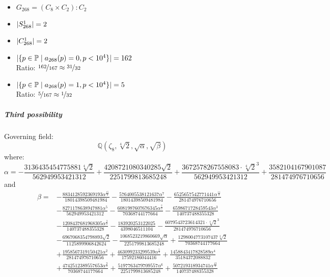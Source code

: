\begin{multicols}{2}
	\begin{itemize}
		\item $G_{268} = (C_8 \times C_2) : C_2$
		\item $| S_{268}^1 | = 2$
		\item $| C_{268}^1 | = 2$
	\end{itemize}
	\begin{itemize}
		\item $| \{ p \in \mathbb{P} \mid a_{268}(p)=0, p<10^4 \} | = 162$\\
		Ratio: $\nicefrac{ 162 }{ 167 } \approx \nicefrac{ 31 }{ 32 }$
		\item $| \{ p \in \mathbb{P} \mid a_{268}(p)=1, p<10^4 \} | = 5$\\
		Ratio: $\nicefrac{ 5 }{ 167 } \approx \nicefrac{ 1 }{ 32 }$
	\end{itemize}
\end{multicols}
\subparagraph{Third possibility}
Governing field:
$$\mathbb{Q}\left(\zeta_8, \sqrt[4]{2}, \sqrt{\alpha}, \sqrt{\beta}\right)$$
where:
$$\alpha = - \frac{3136435454775881 \sqrt[4]{2}}{562949953421312} + \frac{4208721080340285 \sqrt{2}}{2251799813685248} + \frac{3672578267558083 \cdot \sqrt[4]{2}^3}{562949953421312} + \frac{3582104167901087}{281474976710656}$$
and
\begin{align*}
\beta = 
&- \frac{8834128592369193 \alpha^{\frac{15}{2}}}{18014398509481984} 
- \frac{5764005538121637 \alpha^{7}}{18014398509481984} 
- \frac{6525657542771441 \alpha^{\frac{11}{2}}}{281474976710656} 
\\
&- \frac{8271178638947881 \alpha^{5}}{562949953421312} 
- \frac{6081987607676345 \alpha^{\frac{7}{2}}}{70368744177664} 
- \frac{6598671728459543 \alpha^{3}}{140737488355328} 
\\
&- \frac{1208437681968305 \alpha^{\frac{3}{2}}}{140737488355328} 
- \frac{183920253122025}{4398046511104} 
- \frac{6079543723614321 \cdot \sqrt[4]{2}^3}{281474976710656} 
\\
&- \frac{6967068354798893 \sqrt{2}}{1125899906842624} 
- \frac{1068523219860669 \sqrt{\alpha}}{2251799813685248} 
+ \frac{1298004773107437 \sqrt[4]{2}}{70368744177664} 
\\
&+ \frac{1958567319150421 \alpha^{2}}{281474976710656} 
+ \frac{463099233299539 \alpha^{\frac{5}{2}}}{17592186044416} 
+ \frac{1458843417828589 \alpha^{4}}{35184372088832} 
\\
&+ \frac{4742512389557653 \alpha^{\frac{9}{2}}}{70368744177664} 
+ \frac{5197763479709557 \alpha^{6}}{2251799813685248} 
+ \frac{507219318934741 \alpha^{\frac{13}{2}}}{140737488355328}
\end{align*}
